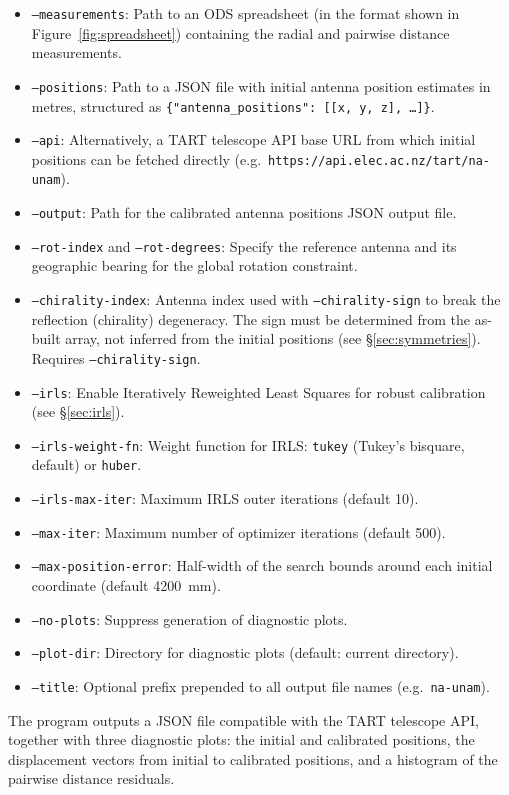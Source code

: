 \documentclass[twocolumn, a4paper,10pt]{article}
\begin{document}
\begin{itemize}
	\item \texttt{--measurements}: Path to an ODS spreadsheet (in the format shown in Figure~\ref{fig:spreadsheet}) containing the radial and pairwise distance measurements.
	\item \texttt{--positions}: Path to a JSON file with initial antenna position estimates in metres, structured as \texttt{\{"antenna\_positions": [[x, y, z], \ldots]\}}.
	\item \texttt{--api}: Alternatively, a TART telescope API base URL from which initial positions can be fetched directly (e.g.\ \texttt{https://api.elec.ac.nz/tart/na-unam}).
	\item \texttt{--output}: Path for the calibrated antenna positions JSON output file.
	\item \texttt{--rot-index} and \texttt{--rot-degrees}: Specify the reference antenna and its geographic bearing for the global rotation constraint.
	\item \texttt{--chirality-index}: Antenna index used with \texttt{--chirality-sign} to break the reflection (chirality) degeneracy.  The sign must be determined from the as-built array, not inferred from the initial positions (see \S\ref{sec:symmetries}).  Requires \texttt{--chirality-sign}.
	\item \texttt{--irls}: Enable Iteratively Reweighted Least Squares for robust calibration (see \S\ref{sec:irls}).
	\item \texttt{--irls-weight-fn}: Weight function for IRLS: \texttt{tukey} (Tukey's bisquare, default) or \texttt{huber}.
	\item \texttt{--irls-max-iter}: Maximum IRLS outer iterations (default 10).
	\item \texttt{--max-iter}: Maximum number of optimizer iterations (default 500).
	\item \texttt{--max-position-error}: Half-width of the search bounds around each initial coordinate (default 4200~mm).
	\item \texttt{--no-plots}: Suppress generation of diagnostic plots.
	\item \texttt{--plot-dir}: Directory for diagnostic plots (default: current directory).
	\item \texttt{--title}: Optional prefix prepended to all output file names (e.g.\ \texttt{na-unam}).
\end{itemize}

The program outputs a JSON file compatible with the TART telescope API, together with three diagnostic plots: the initial and calibrated positions, the displacement vectors from initial to calibrated positions, and a histogram of the pairwise distance residuals.
\end{document}
